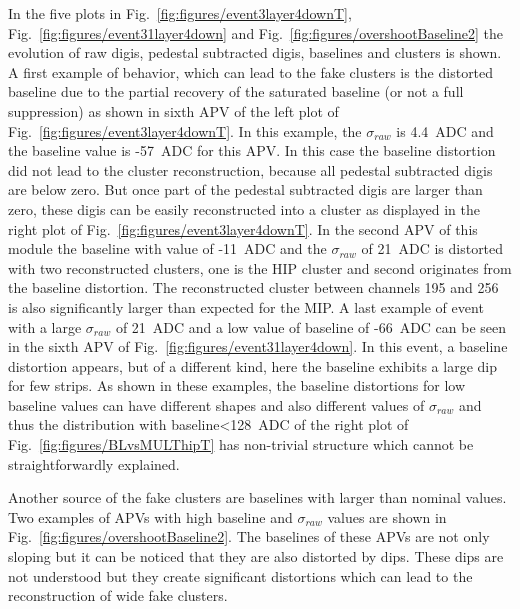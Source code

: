 In the five plots in Fig.~\ref{fig:figures/event3layer4downT},  Fig.~\ref{fig:figures/event31layer4down} and Fig.~\ref{fig:figures/overshootBaseline2} the evolution of raw digis, pedestal subtracted digis, baselines and clusters is shown. A first example of behavior, which can lead to the fake clusters is the distorted baseline due to the partial recovery of the saturated baseline (or not a full suppression) as shown in sixth APV of the left plot of Fig.~\ref{fig:figures/event3layer4downT}. In this example, the $\sigma_{raw}$ is 4.4~ADC and the baseline value is -57~ADC for this APV. In this case the baseline distortion did not lead to the cluster reconstruction, because all pedestal subtracted digis are below zero. But once part of the pedestal subtracted digis are larger than zero, these digis can be easily reconstructed into a cluster as displayed in the right plot of  Fig.~\ref{fig:figures/event3layer4downT}. In the second APV of this module the baseline with value of -11~ADC and the $\sigma_{raw}$ of 21~ADC is distorted with two reconstructed clusters, one is the HIP cluster and second originates from the baseline distortion. The reconstructed cluster between channels 195 and 256 is also significantly larger than expected for the MIP. A last example of event with a large $\sigma_{raw}$ of 21~ADC and a low value of baseline of -66~ADC can be seen in the sixth APV of Fig.~\ref{fig:figures/event31layer4down}. In this event, a baseline distortion appears, but of a different kind, here the baseline exhibits a large dip for few strips. As shown in these examples, the baseline distortions for low baseline values can have different shapes and also different values of $\sigma_{raw}$ and thus the distribution with baseline<128~ADC of the right plot of Fig.~\ref{fig:figures/BLvsMULThipT} has non-trivial structure which cannot be straightforwardly explained. 

Another source of the fake clusters are baselines with larger than nominal values. Two examples of APVs with high baseline and $\sigma_{raw}$ values are shown in Fig.~\ref{fig:figures/overshootBaseline2}. The baselines of these APVs are not only sloping but it can be noticed that they are also distorted by dips. These dips are not understood but they create significant distortions which can lead to the reconstruction of wide fake clusters.


